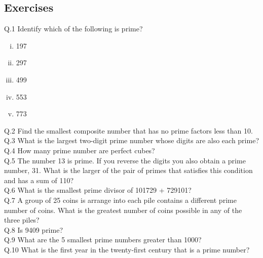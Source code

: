 \subsection{Exercises}
Q.1 {Identify which of the following is prime?}
\begin{multicols}{3}
\begin{enumerate}[(i)]
\item 197
\item 297
\item 499
\item 553
\item 773
\end{enumerate}
\end{multicols}
\noindent Q.2 {Find the smallest composite number that has no prime
factors less than 10.}\\
Q.3 {What is the largest two-digit prime number whose digits
are also each prime?}\\
Q.4 {How many prime number are perfect cubes?}\\
Q.5 {The number 13 is prime. If you reverse the digits you
also obtain a prime number, 31.
What is the larger of the pair of primes that satisfies this condition
and has a sum of 110?}\\
Q.6 {What is the smallest prime divisor of 101729 + 729101?}\\
Q.7 {A group of 25 coins is arrange into %
each pile contains a different
prime number of coins. What is the greatest number of coins possible in
any of the three
piles?}\\
Q.8 {Is 9409 prime?}\\
Q.9 {What are the 5 smallest prime numbers greater than 1000?}\\
Q.10 {What is the first year in the twenty-first century that
is a prime number?}\\
\newpage
\begin{center}
\end{center}
